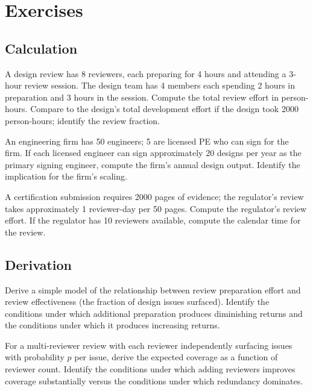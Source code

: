 \section{Exercises}

\subsection*{Calculation}

\begin{exercise}
A design review has 8 reviewers, each preparing for 4 hours and attending a 3-hour review session. The design team has 4 members each spending 2 hours in preparation and 3 hours in the session. Compute the total review effort in person-hours. Compare to the design's total development effort if the design took 2000 person-hours; identify the review fraction.
\end{exercise}

\begin{exercise}
An engineering firm has 50 engineers; 5 are licensed PE who can sign for the firm. If each licensed engineer can sign approximately 20 designs per year as the primary signing engineer, compute the firm's annual design output. Identify the implication for the firm's scaling.
\end{exercise}

\begin{exercise}
A certification submission requires 2000 pages of evidence; the regulator's review takes approximately 1 reviewer-day per 50 pages. Compute the regulator's review effort. If the regulator has 10 reviewers available, compute the calendar time for the review.
\end{exercise}

\subsection*{Derivation}

\begin{exercise}
Derive a simple model of the relationship between review preparation effort and review effectiveness (the fraction of design issues surfaced). Identify the conditions under which additional preparation produces diminishing returns and the conditions under which it produces increasing returns.
\end{exercise}

\begin{exercise}
For a multi-reviewer review with each reviewer independently surfacing issues with probability $p$ per issue, derive the expected coverage as a function of reviewer count. Identify the conditions under which adding reviewers improves coverage substantially versus the conditions under which redundancy dominates.
\end{exercise}

